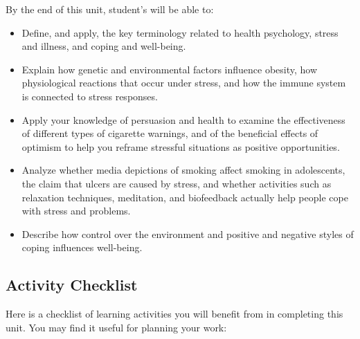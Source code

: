 \documentclass[
]{book}
\providecommand{\tightlist}{%
  \setlength{\itemsep}{0pt}\setlength{\parskip}{0pt}}
\begin{document}
By the end of this unit, student's will be able to:

\begin{itemize}
\tightlist
\item
  Define, and apply, the key terminology related to health psychology, stress and illness, and coping and well-being.\\
\item
  Explain how genetic and environmental factors influence obesity, how physiological reactions that occur under stress, and how the immune system is connected to stress responses.\\
\item
  Apply your knowledge of persuasion and health to examine the effectiveness of different types of cigarette warnings, and of the beneficial effects of optimism to help you reframe stressful situations as positive opportunities.\\
\item
  Analyze whether media depictions of smoking affect smoking in adolescents, the claim that ulcers are caused by stress, and whether activities such as relaxation techniques, meditation, and biofeedback actually help people cope with stress and problems.\\
\item
  Describe how control over the environment and positive and negative styles of coping influences well-being.
\end{itemize}

\hypertarget{activity-checklist-6}{%
\subsection*{Activity Checklist}\label{activity-checklist-6}}

Here is a checklist of learning activities you will benefit from in completing this unit. You may find it useful for planning your work:
\end{document}
